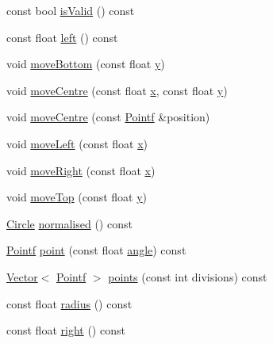 \begin{DoxyCompactItemize}
\item 
const bool \hyperlink{classprism_1_1_circle_adbc46c944f02c028ec95acd1a9b69c5b}{is\+Valid} () const 
\item 
const float \hyperlink{classprism_1_1_circle_a8bcb92c5bf29227e2ef5ab0f15b479b2}{left} () const 
\item 
void \hyperlink{classprism_1_1_circle_a6392112dd312ec8564596fe00b1e48fa}{move\+Bottom} (const float \hyperlink{classprism_1_1_circle_a6edc045d912b0d278bd0673af028290e}{y})
\item 
void \hyperlink{classprism_1_1_circle_a1ba209c5aed82199e76427311e4781d2}{move\+Centre} (const float \hyperlink{classprism_1_1_circle_ae1f729f8fa34605123628e67b230b6be}{x}, const float \hyperlink{classprism_1_1_circle_a6edc045d912b0d278bd0673af028290e}{y})
\item 
void \hyperlink{classprism_1_1_circle_aad52d595e31c43a9dc8a3b6ea210a285}{move\+Centre} (const \hyperlink{classprism_1_1_pointf}{Pointf} \&position)
\item 
void \hyperlink{classprism_1_1_circle_a68a4710fab3752158a149bd9be64f393}{move\+Left} (const float \hyperlink{classprism_1_1_circle_ae1f729f8fa34605123628e67b230b6be}{x})
\item 
void \hyperlink{classprism_1_1_circle_ae7d7bbe94f43d61ae8adc764e6cf0e9a}{move\+Right} (const float \hyperlink{classprism_1_1_circle_ae1f729f8fa34605123628e67b230b6be}{x})
\item 
void \hyperlink{classprism_1_1_circle_a6ed1dd2554b297751bb29c22eae26038}{move\+Top} (const float \hyperlink{classprism_1_1_circle_a6edc045d912b0d278bd0673af028290e}{y})
\item 
\hyperlink{classprism_1_1_circle}{Circle} \hyperlink{classprism_1_1_circle_a6216b04502cff2b3367d417b1c4b3c5a}{normalised} () const 
\item 
\hyperlink{classprism_1_1_pointf}{Pointf} \hyperlink{classprism_1_1_circle_a42e70e1d37414bf4c22500b80b168c9d}{point} (const float \hyperlink{classprism_1_1_circle_ad4b91cf13b593a67abf9782db3fec5d9}{angle}) const 
\item 
\hyperlink{classprism_1_1_vector}{Vector}$<$ \hyperlink{classprism_1_1_pointf}{Pointf} $>$ \hyperlink{classprism_1_1_circle_a1443add46fe3c7d3e6c938cf0a43ba57}{points} (const int divisions) const 
\item 
const float \hyperlink{classprism_1_1_circle_a75afa2c59f92909d6b6edcec338030fb}{radius} () const 
\item 
const float \hyperlink{classprism_1_1_circle_a3b8cdbb5ad090615534c09543afadf88}{right} () const 

\end{DoxyCompactItemize}
